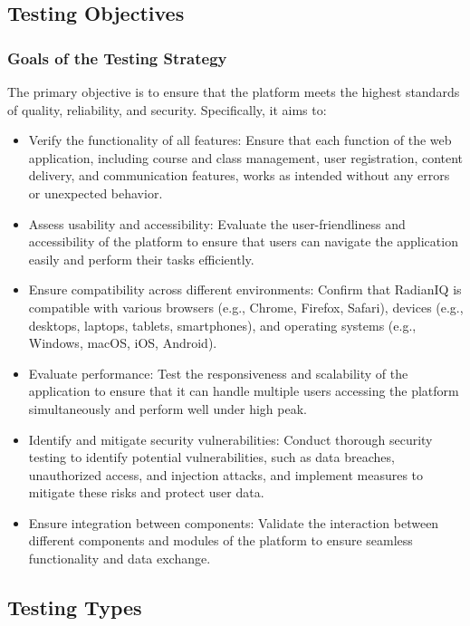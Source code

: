 		
		
	\subsection{Testing Objectives}
	
		\subsubsection{Goals of the Testing Strategy}
		
		The primary objective is to ensure that the platform meets the highest standards of quality, reliability, and security. Specifically, it aims to:
		
		\begin{itemize}
			\item Verify the functionality of all features: Ensure that each function of the web application, including course and class management, user registration, content delivery, and communication features, works as intended without any errors or unexpected behavior.
			\item Assess usability and accessibility: Evaluate the user-friendliness and accessibility of the platform to ensure that users can navigate the application easily and perform their tasks efficiently.
			\item Ensure compatibility across different environments: Confirm that RadianIQ is compatible with various browsers (e.g., Chrome, Firefox, Safari), devices (e.g., desktops, laptops, tablets, smartphones), and operating systems (e.g., Windows, macOS, iOS, Android).
			\item Evaluate performance: Test the responsiveness and scalability of the application to ensure that it can handle multiple users accessing the platform simultaneously and perform well under high peak.
			\item Identify and mitigate security vulnerabilities: Conduct thorough security testing to identify potential vulnerabilities, such as data breaches, unauthorized access, and injection attacks, and implement measures to mitigate these risks and protect user data.
			\item Ensure integration between components: Validate the interaction between different components and modules of the platform to ensure seamless functionality and data exchange.
		\end{itemize}

		
	\subsection{Testing Types}
		
